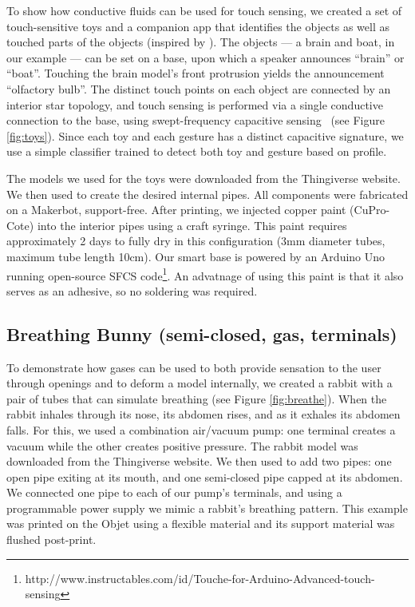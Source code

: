 To show how conductive fluids can be used for touch sensing, we created a set of touch-sensitive toys and a companion app that identifies the objects as well as touched parts of the objects (inspired by \cite{Harrison-acoustic}). The objects --- a brain and boat, in our example --- can be set on a base, upon which a speaker announces ``brain'' or ``boat''. Touching the brain model's front protrusion yields the announcement ``olfactory bulb''. The distinct touch points on each object are connected by an interior star topology, and touch sensing is performed via a single conductive connection to the base, using swept-frequency capacitive sensing~\cite{Sato-touche} (see Figure \ref{fig:toys}). %
Since each toy and each gesture has a distinct capacitive signature, we use a simple classifier trained to detect both toy and gesture based on profile.

The models we used for the toys were downloaded from the  Thingiverse website. We then used \systemnamenospace to create the desired internal pipes. All components were fabricated on a Makerbot, support-free.  After printing, we injected copper paint (CuPro-Cote) into the interior pipes using a craft syringe.  This paint requires approximately 2 days to fully dry in this configuration (3mm diameter tubes, maximum tube length 10cm).  Our smart base is powered by an Arduino Uno running open-source SFCS code\footnote{http://www.instructables.com/id/Touche-for-Arduino-Advanced-touch-sensing}. An advatnage of using this paint is that it also serves as an adhesive, so no soldering was required. 

\subsection{Breathing Bunny (semi-closed, gas, terminals)}

To demonstrate how gases can be used to both provide sensation to the user through openings and to deform a model internally, we created a rabbit with a pair of tubes that can simulate breathing (see Figure \ref{fig:breathe}).  When the rabbit inhales through its nose, its abdomen rises, and as it exhales its abdomen falls.  For this, we used a combination air/vacuum pump: one terminal creates a vacuum while the other creates positive pressure.  
The rabbit model was downloaded from the Thingiverse website.  We then used \systemnamenospace to add two pipes: one open pipe exiting at its mouth, and one semi-closed pipe capped at its abdomen.  We connected one pipe to each of our pump's terminals, and using a programmable power supply we mimic a rabbit's breathing pattern.  This example was printed on the Objet using a flexible material and its support material was flushed post-print.

